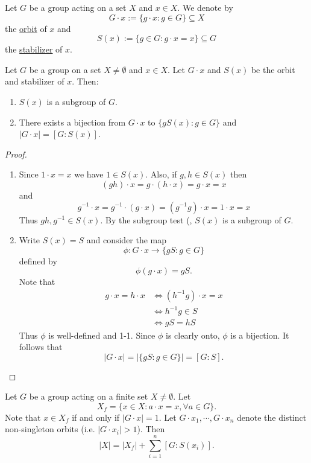 \documentclass[11pt]{article}
\begin{document}
\begin{definition}
    Let $G$ be a group acting on a set $X$ and $x\in X$. We denote by
    \[G\cdot x:=\{g\cdot x:g\in G\}\subseteq X\]
    the \ul{orbit} of $x$ and
    \[S(x):=\{g\in G:g\cdot x=x\}\subseteq G\]
    the \ul{stabilizer} of $x$.
\end{definition}

\begin{proposition}
    Let $G$ be a group on a set $X\neq\emptyset$ and $x\in X$. Let $G\cdot x$ and $S(x)$ be the orbit and stabilizer of $x$. Then:
    \begin{enumerate}
        \item $S(x)$ is a subgroup of $G$.
        \item There exists a bijection from $G\cdot x$ to $\{gS(x):g\in G\}$ and $|G\cdot x|=[G:S(x)]$.
    \end{enumerate}
\end{proposition}

\begin{proof}\,
\begin{enumerate}
    \item Since $1\cdot x=x$ we have $1\in S(x)$. Also, if $g,h\in S(x)$ then $$(gh)\cdot x=g\cdot (h\cdot x)=g\cdot x=x$$
    and
    \[g^{-1}\cdot x=g^{-1}\cdot(g\cdot x)=(g^{-1}g)\cdot x=1\cdot x=x\]
    Thus $gh,g^{-1}\in S(x)$. By the subgroup test (, $S(x)$ is a subgroup of $G$.

    \item Write $S(x)=S$ and consider the map
    \[\phi:G\cdot x\to\{gS:g\in G\}\]
    defined by
    \[\phi(g\cdot x)=gS.\]
    Note that
    \begin{align*}
        g\cdot x=h\cdot x&\iff(h^{-1}g)\cdot x=x \\
        &\iff h^{-1}g\in S \\
        &\iff gS=hS
    \end{align*}
    Thus $\phi$ is well-defined and 1-1. Since $\phi$ is clearly onto, $\phi$ is a bijection. It follows that
    \[|G\cdot x|=|\{gS:g\in G\}|=[G:S].\]
\end{enumerate}
\end{proof}

\begin{theorem}
    Let $G$ be a group acting on a finite set $X\neq\emptyset$. Let
    \[X_f=\{x\in X:a\cdot x=x,\forall a\in G\}.\]
    Note that $x\in X_f$ if and only if $|G\cdot x|=1$. Let $G\cdot x_1,\cdots,G\cdot x_n$ denote the distinct non-singleton orbits (i.e. $|G\cdot x_i|>1$). Then
    \[|X|=|X_f|+\sum\limits_{i=1}^n[G:S(x_i)].\]
\end{theorem}
\end{document}
